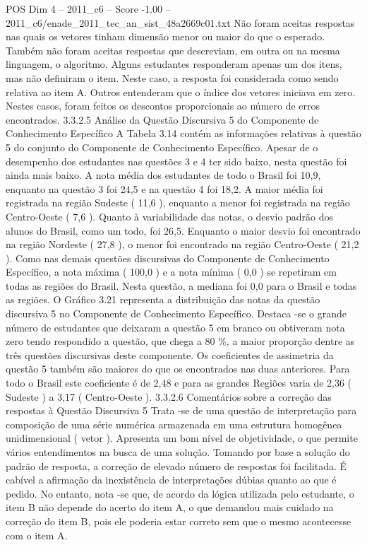 \begin{textsample}{POS Dim 4 – 2011\_c6 – Score -1.00 – 2011\_c6/enade\_2011\_tec\_an\_sist\_48a2669c01.txt}
Não foram aceitas respostas nas quais os vetores tinham dimensão menor ou maior do que o esperado.
Também não foram aceitas respostas que descreviam, em outra ou na mesma linguagem, o algoritmo.
Alguns estudantes responderam apenas um dos itens, mas não definiram o item.
Neste caso, a resposta foi considerada como sendo relativa ao item A.
Outros entenderam que o índice dos vetores iniciava em zero.
Nestes casos, foram feitos os descontos proporcionais ao número de erros encontrados. 3.3.2.5 Análise da Questão Discursiva 5 do Componente de Conhecimento Específico A Tabela 3.14 contém as informações relativas à questão 5 do conjunto do Componente de Conhecimento Específico.
Apesar de o desempenho dos estudantes nas questões 3 e 4 ter sido baixo, nesta questão foi ainda mais baixo.
A nota média dos estudantes de todo o Brasil foi 10,9, enquanto na questão 3 foi 24,5 e na questão 4 foi 18,2.
A maior média foi registrada na região Sudeste ( 11,6 ), enquanto a menor foi registrada na região Centro-Oeste ( 7,6 ).
Quanto à variabilidade das notas, o desvio padrão dos alunos do Brasil, como um todo, foi 26,5.
Enquanto o maior desvio foi encontrado na região Nordeste ( 27,8 ), o menor foi encontrado na região Centro-Oeste ( 21,2 ).
Como nas demais questões discursivas do Componente de Conhecimento Específico, a nota máxima ( 100,0 ) e a nota mínima ( 0,0 ) se repetiram em todas as regiões do Brasil.
Nesta questão, a mediana foi 0,0 para o Brasil e todas as regiões.
O Gráfico 3.21 representa a distribuição das notas da questão discursiva 5 no Componente de Conhecimento Específico.
Destaca -se o grande número de estudantes que deixaram a questão 5 em branco ou obtiveram nota zero tendo respondido a questão, que chega a 80 \%, a maior proporção dentre as três questões discursivas deste componente.
Os coeficientes de assimetria da questão 5 também são maiores do que os encontrados nas duas anteriores.
Para todo o Brasil este coeficiente é de 2,48 e para as grandes Regiões varia de 2,36 ( Sudeste ) a 3,17 ( Centro-Oeste ). 3.3.2.6 Comentários sobre a correção das respostas à Questão Discursiva 5 Trata -se de uma questão de interpretação para composição de uma série numérica armazenada em uma estrutura homogênea unidimensional ( vetor ).
Apresenta um bom nível de objetividade, o que permite vários entendimentos na busca de uma solução.
Tomando por base a solução do padrão de resposta, a correção de elevado número de respostas foi facilitada.
É cabível a afirmação da inexistência de interpretações dúbias quanto ao que é pedido.
No entanto, nota -se que, de acordo da lógica utilizada pelo estudante, o item B não depende do acerto do item A, o que demandou mais cuidado na correção do item B, pois ele poderia estar correto sem que o mesmo acontecesse com o item A.

\end{textsample}
